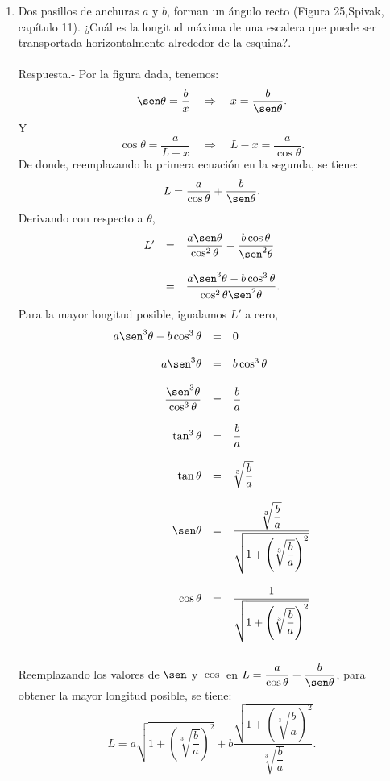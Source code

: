 \begin{enumerate}[\bfseries 1.]
    \item Dos pasillos de anchuras $a$ y $b$, forman un ángulo recto (Figura 25,Spivak, capítulo 11). ¿Cuál es la longitud máxima de una escalera que puede ser transportada horizontalmente alrededor de la esquina?.\\\\
	Respuesta.-\; Por la figura dada, tenemos:
	$$\sen \theta = \dfrac{b}{x}\quad \Rightarrow \quad x=\dfrac{b}{\sen \theta}.$$
	Y
	$$\cos \theta = \dfrac{a}{L-x}\quad \Rightarrow \quad L-x=\dfrac{a}{\cos \theta}.$$
	De donde, reemplazando la primera ecuación en la segunda, se tiene:
	$$L=\dfrac{a}{\cos \theta}+\dfrac{b}{\sen \theta}.$$
	Derivando con respecto a $\theta$,
	$$\begin{array}{rcl}
	    L'&=&\dfrac{a\sen \theta}{\cos^2\theta}-\dfrac{b\cos \theta}{\sen^2 \theta}\\\\
	      &=&\dfrac{a\sen^3\theta-b\cos^3\theta}{\cos^2\theta\sen^2\theta}.
	\end{array}$$
	Para la mayor longitud posible, igualamos $L'$ a cero,
	$$\begin{array}{rcl}
	    a\sen^3\theta-b\cos^3\theta&=&0\\\\
	    a\sen^3\theta&=&b\cos^3\theta\\\\
	    \dfrac{\sen^3\theta}{\cos^3\theta}&=&\dfrac{b}{a}\\\\
	    \tan^3\theta&=&\dfrac{b}{a}\\\\
	    \tan \theta &=& \sqrt[3]{\dfrac{b}{a}}\\\\
	    \sen\theta &=&\dfrac{\sqrt[3]{\dfrac{b}{a}}}{\sqrt{1+\left(\sqrt[3]{\dfrac{b}{a}}\right)^2}}\\\\
	    \cos\theta &=& \dfrac{1}{\sqrt{1+\left(\sqrt[3]{\dfrac{b}{a}}\right)^2}}\\\\
	\end{array}$$
	Reemplazando los valores de $\sen$ y $\cos$ en $L=\dfrac{a}{\cos \theta}+\dfrac{b}{\sen \theta}$, para obtener la mayor longitud posible, se tiene:
	$$L=a\sqrt{1+\left(\sqrt[3]{\dfrac{b}{a}}\right)^2}+b\dfrac{\sqrt{1+\left(\sqrt[3]{\dfrac{b}{a}}\right)^2}}{\sqrt[3]{\dfrac{b}{a}}}.$$\\


\end{enumerate}
